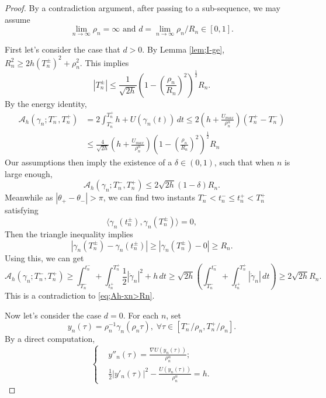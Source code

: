 \documentclass[10pt,a4paper]{amsart}
\newcommand{\A}{\mathcal A}
\newcommand{\al}{\alpha}
\newcommand{\dl}{\delta}
\newcommand{\ey}{\frac{1}{2}}
\newcommand{\gm}{\gamma}
\newcommand{\tht}{\theta}
\begin{document}
\begin{proof}
By a contradiction argument, after passing to a  sub-sequence, we may assume 
$$ \lim_{n \to \infty} \rho_n =\infty \text{ and } d = \lim_{n \to \infty} \rho_n /R_n \in [0, 1]. $$

First let's consider the case that $d >0$. By Lemma \ref{lem;I-ge}, $R_n^2 \ge 2h (T^{\pm}_n)^2 + \rho_n^2$. This implies
$$ |T_n^{\pm}| \le \frac{1}{\sqrt{2h}} \left( 1 -\left( \frac{\rho_n}{R_n} \right)^2 \right)^{\ey} R_n. $$
By the energy identity,
\begin{equation*} 
\begin{aligned}
\A_h(\gm_n; T_n^-, T_n^+) & = 2 \int_{T_n^-}^{T_n^+} h + U(\gm_n(t)) \,dt \le 2 \left( h + \frac{U_{max}}{\rho_n^{\al}} \right) (T^+_n -T^-_n) \\
& \le \frac{4}{\sqrt{2h}} \left( h + \frac{U_{max}}{\rho_n^{\al}} \right)  \left( 1 -\left( \frac{\rho_n}{R_n} \right)^2 \right)^{\ey} R_n
\end{aligned}
\end{equation*} 
Our assumptions then imply the existence of a $\dl \in (0, 1)$, such that when $n$ is large enough,
\begin{equation} \label{eq;Ah-xn>Rn}
\A_h(\gm_n; T_n^-, T_n^+)  \le 2 \sqrt{2h} (1 - \dl) R_n.
\end{equation}
Meanwhile as $ |\tht_+ - \tht_-|>\pi$, we can find two instants $T_n^- < t_n^- \le t_n^+ < T_n^+$ satisfying
$$ \langle \gm_n(t_n^{\pm}), \gm_n(T_n^{\pm}) \rangle =0,$$
Then the triangle inequality implies 
$$ |\gm_n(T_n^{\pm}) - \gm_n(t_n^{\pm})| \ge |\gm_n(T_n^{\pm}) -0| \ge R_n. $$
Using this, we can get 
$$  
\A_h(\gm_n; T_n^-, T_n^+)  \ge \int_{T_n^-}^{t_n^-} + \int_{t_n^+}^{T_n^+} \ey |\dot{\gm}_n|^2 + h \,dt  \ge \sqrt{2h}   \left( \int_{T_n^-}^{t_n^-}  + \int_{t_n^+}^{T_n^+} |\dot{\gm}_n|  \,dt \right) \ge 2 \sqrt{2h} R_n.  
$$
This is a contradiction to \eqref{eq;Ah-xn>Rn}. 

Now let's consider the case $d=0$. For each $n$, set 
$$ y_n(\tau) = \rho_n^{-1} \gm_n(\rho_n \tau), \; \forall \tau \in [T_n^-/\rho_n, T_n^+/\rho_n]. $$
By a direct computation,
\begin{equation}
\label{eq;yn''} \begin{cases}
& y''_n(\tau) = \frac{\nabla U(y_n(\tau))}{\rho_n^{\al}  }; \\
& \ey |y'_n(\tau)|^2 - \frac{U(y_n(\tau))}{\rho_n^{\al} } = h.
\end{cases}
\end{equation} 


\end{proof}
\end{document}
